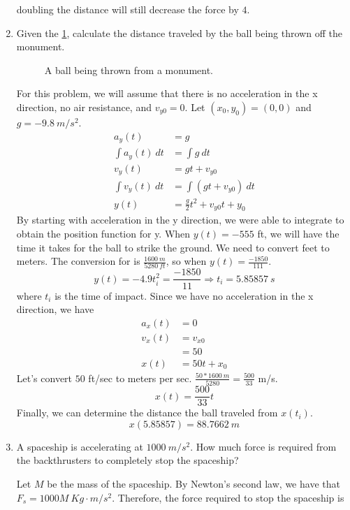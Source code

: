 \begin{enumerate}
\[  \]
  doubling the distance will still decrease the force by \(4\).
\item
  Given the \cref{NUPOCphysics5}, calculate the distance traveled by the ball
  being thrown off the monument.
  \begin{figure}[H]
    \centering
    
    \caption{A ball being thrown from a monument.}
    \label{NUPOCphysics5}
  \end{figure}
  For this problem, we will assume that there is no acceleration in the x
  direction, no air resistance, and \(v_{y0} = 0\).
  Let \((x_0, y_0) = (0, 0)\) and \(g = -9.8 \ m/s^2\). 
  \begin{align*}
    a_y(t) &= g\\
    \int a_y(t) \ dt &= \int g \ dt\\
    v_y(t) &= gt + v_{y0}\\
    \int v_y(t) \ dt &= \int(gt + v_{y0}) \ dt\\
    y(t) &= \frac{g}{2}t^2 + v_{y0}t + y_0
  \end{align*}
  By starting with acceleration in the y direction, we were able to integrate
  to obtain the position function for y.
  When \(y(t) = -555\) ft, we will have the time it takes for the ball to strike
  the ground.
  We need to convert feet to meters.
  The conversion for is \(\frac{1600 \ m}{5280 \ ft}\), so when
  \(y(t) = \frac{-1850}{111}\).
  \[
  y(t) = -4.9t_i^2 = \frac{-1850}{11}\Rightarrow t_i = 5.85857 \ s
  \]
  where \(t_i\) is the time of impact.
  Since we have no acceleration in the x direction, we have
  \begin{align*}
    a_x(t) &= 0\\
    v_x(t) &= v_{x0}\\
           &= 50\\
    x(t) &= 50t + x_0
  \end{align*}
  Let's convert \(50\) ft/sec to meters per sec.
  \(\frac{50 * 1600 \ m}{5280} = \frac{500}{33}\) m/s.
  \[
  x(t) = \frac{500}{33}t
  \]
  Finally, we can determine the distance the ball traveled from \(x(t_i)\).
  \[
  x(5.85857) = 88.7662 \ m
  \]
\item
  A spaceship is accelerating at \(1000 \ m/s^2\).
  How much force is required from the backthrusters to completely stop the
  spaceship?
  \par\smallskip
  Let \(M\) be the mass of the spaceship.
  By Newton's second law, we have that \(F_s = 1000M \ Kg\cdot m/s^2\).
  Therefore, the force required to stop the spaceship is

\end{enumerate}
